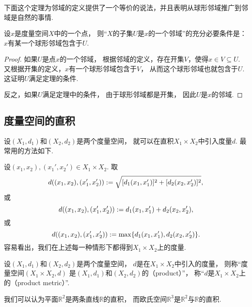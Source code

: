 下面这个定理为邻域的定义提供了一个等价的说法，并且表明从球形邻域推广到邻域是自然的事情.
\begin{theorem}\label{theorem:度量空间.邻域的判定}
设\(x\)是度量空间\(X\)中的一个点，
则“\(X\)的子集\(U\)是\(x\)的一个邻域”的充分必要条件是：
\(x\)有某一个球形邻域包含于\(U\).
\begin{proof}
如果\(U\)是点\(x\)的一个邻域，
根据邻域的定义，存在开集\(V\)，使得\(x \in V \subseteq U\).
又根据开集的定义，\(x\)有一个球形邻域包含于\(V\)，
从而这个球形邻域也就包含于\(U\).
这证明\(U\)满足定理的条件.

反之，如果\(U\)满足定理中的条件，
由于球形邻域都是开集，
因此\(U\)是\(x\)的邻域.
\end{proof}
\end{theorem}

\subsection{度量空间的直积}
\begingroup
\def\A{X_1}\def\B{X_2}
\def\dA{d_1}\def\dB{d_2}
\def\X{(x_1,x_2)}
\def\Y{(x_1',x_2')}
\def\dAA{d_1(x_1,x_1')}
\def\dBB{d_2(x_2,x_2')}
设\((X_1,d_1)\)和\((X_2,d_2)\)是两个度量空间，
就可以在直积\(X_1 \times X_2\)中引入度量\(d\).
最常用的方法如下.

设\(\X,\Y\in X_1 \times X_2\).
取\begin{equation*}
	d(\X,\Y)
	\defeq
	\sqrt{[\dAA]^2+[\dBB]^2},
\end{equation*}
或\begin{equation*}
	d(\X,\Y)
	\defeq
	\dAA+\dBB,
\end{equation*}
或\begin{equation*}
	d(\X,\Y)
	\defeq
	\max\{\dAA,\dBB\}.
\end{equation*}
容易看出，我们在上述每一种情形下都得到\(X_1 \times X_2\)上的度量.

\begin{definition}
设\((X_1,d_1)\)和\((X_2,d_2)\)是两个度量空间，
\(d\)是在\(X_1 \times X_2\)中引入的度量，
则称“度量空间\((X_1 \times X_2,d)\)
是\((X_1,d_1)\)和\((X_2,d_2)\)的（product）”，
称“\(d\)是\(X_1 \times X_2\)上的（product metric）”.
\end{definition}

\begin{example}
我们可以认为平面\(\mathbb{R}^2\)是两条直线\(\mathbb{R}\)的直积，
而欧氏空间\(\mathbb{R}^3\)是\(\mathbb{R}^2\)与\(\mathbb{R}\)的直积.
\end{example}
\endgroup

